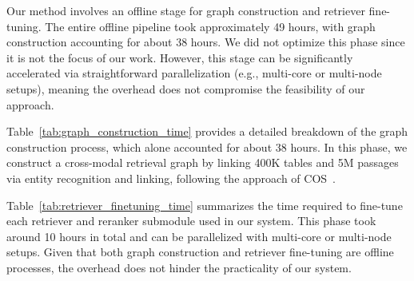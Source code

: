 {\feditcolor
Our method involves an offline stage for graph construction and retriever fine-tuning. 
The entire offline pipeline took approximately 49 hours, with graph construction accounting for about 38 hours. 
We did not optimize this phase since it is not the focus of our work. 
However, this stage can be significantly accelerated via straightforward parallelization (e.g., multi-core or multi-node setups), meaning the overhead does not compromise the feasibility of our approach.

Table~\ref{tab:graph_construction_time} provides a detailed breakdown of the graph construction process, which alone accounted for about 38 hours. 
In this phase, we construct a cross-modal retrieval graph by linking 400K tables and 5M passages via entity recognition and linking, following the approach of COS~\citep{COS}.

\begin{table}[h]
    \centering
    \setlength{\tabcolsep}{2pt}
    \vspace{-3mm}
    \caption{Graph construction time by component.}
    \label{tab:graph_construction_time}
\end{table}

Table~\ref{tab:retriever_finetuning_time} summarizes the time required to fine-tune each retriever and reranker submodule used in our system. 
This phase took around 10 hours in total and can be parallelized with multi-core or multi-node setups. 
Given that both graph construction and retriever fine-tuning are offline processes, the overhead does not hinder the practicality of our system.

}
